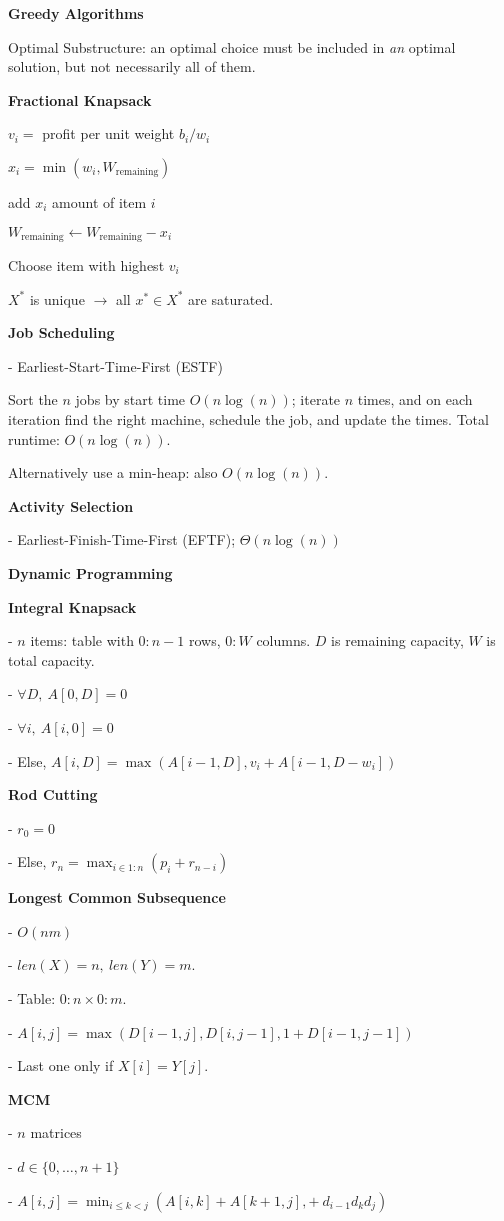 \documentclass[letterpaper]{article}
\begin{document}
\noindent
\begin{minipage}[t]{0.45\textwidth}

    
\textbf{Greedy Algorithms}

Optimal Substructure: an optimal choice must be included in \emph{an} optimal solution, but not necessarily all of them.


\textbf{Fractional Knapsack}

$v_i = $ profit per unit weight $b_i / w_i$

$x_i = \min(w_i, W_\text{remaining})$

add $x_i$ amount of item $i$

$W_\text{remaining} \leftarrow W_\text{remaining} - x_i$

Choose item with highest $v_i$

$X^*$ is unique $\rightarrow$ all $x^* \in X^*$ are saturated.


\textbf{Job Scheduling}

- Earliest-Start-Time-First (ESTF)

Sort the $n$ jobs by start time $O(n\log(n))$; iterate $n$ times, and on each iteration find the right machine, schedule the job, and update the times. Total runtime: $O(n\log(n))$.

Alternatively use a min-heap: also $O(n\log(n))$.


\textbf{Activity Selection}

- Earliest-Finish-Time-First (EFTF); $\Theta(n\log(n))$

\textbf{Dynamic Programming}

\textbf{Integral Knapsack}

- $n$ items: table with $0:n-1$ rows, $0:W$ columns. $D$ is remaining capacity, $W$ is total capacity.

- $\forall D, \ A[0,D] = 0$

- $\forall i, \ A[i,0] = 0$

- Else, $A[i,D] = \max(A[i-1, D], v_i + A[i-1, D - w_i])$

\textbf{Rod Cutting}

- $r_0 = 0$

- Else, $r_n = \max_{i \in 1:n} (p_{i} + r_{n-i})$

\textbf{Longest Common Subsequence}

- $O(nm)$

- $len(X) = n, \ len(Y) = m$.

- Table: $0:n \times 0:m$.

- $A[i,j] = \max(D[i-1, j], D[i, j-1], 1 + D[i-1, j-1])$

- Last one only if $X[i] = Y[j]$.

\textbf{MCM}

- $n$ matrices

- $d \in \{0, \ldots, n+1\}$

- $A[i, j] = \min_{i \leq k < j} (A[i,k] + A[k+1, j], +\ d_{i-1}d_k d_j )$

\end{minipage}
\vline
\hspace{1pt}
\begin{minipage}[t]{0.45\textwidth}


\end{minipage}
\end{document}
